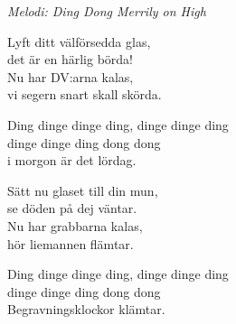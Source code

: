 {\footnotesize\textit{Melodi: Ding Dong Merrily on High}}\par
\vspace{10pt}
Lyft ditt välförsedda glas,\\
det är en härlig börda!\\
Nu har DV:arna kalas,\\
vi segern snart skall skörda.\par
\vspace{10pt}
Ding dinge dinge ding, dinge dinge ding\\
dinge dinge ding dong dong\\
i morgon är det lördag.\par
\vspace{10pt}
Sätt nu glaset till din mun,\\
se döden på dej väntar.\\
Nu har grabbarna kalas,\\
hör liemannen flämtar.\par
\vspace{10pt}
Ding dinge dinge ding, dinge dinge ding\\
dinge dinge ding dong dong\\
Begravningsklockor klämtar.
